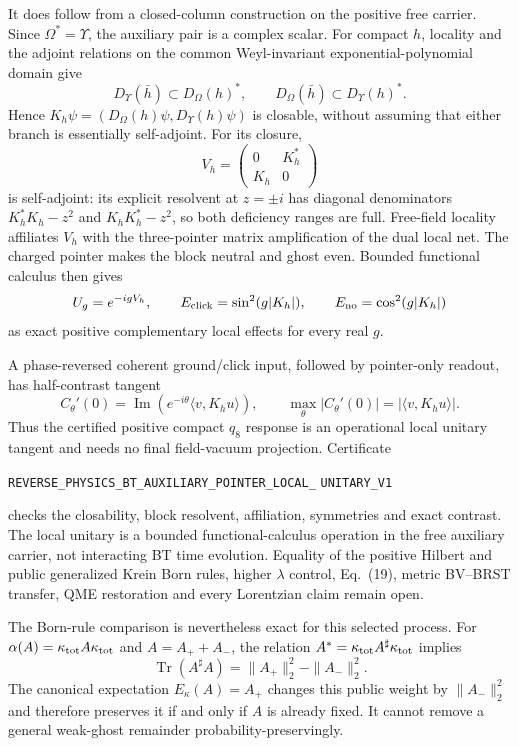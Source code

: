 \documentclass[11pt]{article}
\theoremstyle{definition}
\theoremstyle{remark}
\begin{document}
It does follow from a closed-column construction on the positive free
carrier.  Since $\Omega^*=\Upsilon$, the auxiliary pair is a complex scalar.
For compact $h$, locality and the adjoint relations on the common
Weyl-invariant exponential-polynomial domain
\cite{BFK1996,Sanders2012} give
\[
 D_\Upsilon(\bar h)\subset D_\Omega(h)^*,\qquad
 D_\Omega(\bar h)\subset D_\Upsilon(h)^* .
\]
Hence $K_h\psi=(D_\Omega(h)\psi,D_\Upsilon(h)\psi)$ is closable, without
assuming that either branch is essentially self-adjoint.  For its closure,
\[
 V_h=\begin{pmatrix}0&K_h^*\\K_h&0\end{pmatrix}
\]
is self-adjoint: its explicit resolvent at $z=\pm i$ has diagonal
denominators $K_h^*K_h-z^2$ and $K_hK_h^*-z^2$, so both deficiency ranges
are full.  Free-field locality affiliates $V_h$ with the three-pointer
matrix amplification of the dual local net.  The charged pointer makes the
block neutral and ghost even.  Bounded functional calculus then gives
\[
 U_g=e^{-igV_h},\qquad E_{\rm click}=\sin^2(g|K_h|),\qquad
 E_{\rm no}=\cos^2(g|K_h|)
\]
as exact positive complementary local effects for every real $g$.

A phase-reversed coherent ground/click input, followed by pointer-only
readout, has half-contrast tangent
\[
 C_\theta'(0)=
 \operatorname{Im}\!\left(e^{-i\theta}\langle v,K_hu\rangle\right),
 \qquad \max_\theta|C_\theta'(0)|=|\langle v,K_hu\rangle|.
\]
Thus the certified positive compact $q_8$ response is an operational local
unitary tangent and needs no final field-vacuum projection.  Certificate
\par\noindent
\texttt{REVERSE\_PHYSICS\_BT\_AUXILIARY\_POINTER\_LOCAL\_}
\allowbreak\texttt{UNITARY\_V1}
\par\noindent
checks the closability, block resolvent, affiliation, symmetries and exact
contrast.  The local unitary is a bounded functional-calculus operation in
the free auxiliary carrier, not interacting BT time evolution.  Equality of
the positive Hilbert and public generalized Krein Born rules, higher
$\lambda$ control, Eq.~(19), metric BV--BRST transfer, QME restoration and
every Lorentzian claim remain open.

The Born-rule comparison is nevertheless exact for this selected process.
For \(\alpha(A)=\kappa_{\rm tot}A\kappa_{\rm tot}\) and
\(A=A_++A_-\), the relation
\(A^*=\kappa_{\rm tot}A^\sharp\kappa_{\rm tot}\) implies
\[
 \operatorname{Tr}(A^\sharp A)=\|A_+\|_2^2-\|A_-\|_2^2.
\]
The canonical expectation $E_\kappa(A)=A_+$ changes this public weight by
$\|A_-\|_2^2$ and therefore preserves it if and only if $A$ is already fixed.
It cannot remove a general weak-ghost remainder probability-preservingly.
\end{document}
